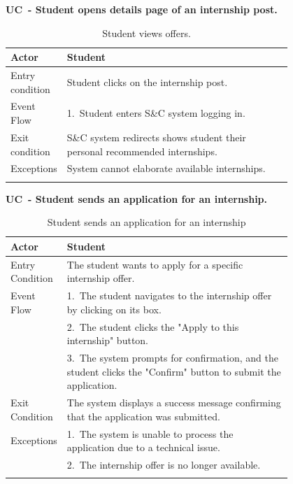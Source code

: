 \textbf{UC\cuc\  - Student opens details page of an internship post.}

\begin{center}
    \renewcommand{\arraystretch}{1.2}
    \begin{longtable}{ l p{0.8\linewidth} } 
        \hline
        Actor & Student \\ \hline
        Entry condition & Student clicks on the internship post.\\ \hline
        Event Flow       & 1.\ Student enters S\&C system logging in.\\ \hline
        Exit condition & S\&C system redirects shows student their personal recommended internships. \\ \hline
        Exceptions  & System cannot elaborate available internships.
        \\ \hline
        \caption{Student views offers.}
        \label{tab:goals_tab}%
    \end{longtable}
\end{center}

\textbf{UC\cuc\  - Student sends an application for an internship.}

\begin{center} 
    \renewcommand{\arraystretch}{1.2} 
    \begin{longtable}{ l p{0.8\linewidth} } 
        \hline 
        Actor & Student \\ \hline 
        Entry Condition & The student wants to apply for a specific internship offer. \\ \hline 
        Event Flow & 1.\ The student navigates to the internship offer by clicking on its box. \\ 
        & 2.\ The student clicks the "Apply to this internship" button. \\ 
        & 3.\ The system prompts for confirmation, and the student clicks the "Confirm" button to submit the application. \\ \hline 
        Exit Condition & The system displays a success message confirming that the application was submitted. \\ \hline 
        Exceptions & 1.\ The system is unable to process the application due to a technical issue. \\ 
        & 2.\ The internship offer is no longer available. \\ \hline 
        \caption{Student sends an application for an internship} 
        \label{tab:student_application_uc} 
    \end{longtable} 
\end{center}

